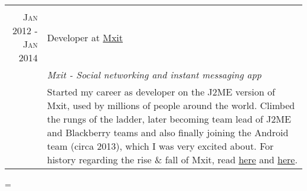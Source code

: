 \documentclass[a4paper,10pt,notitlepage]{article}
\newenvironment{absolutelynopagebreak}
  {\par\nobreak\vfil\penalty0\vfilneg
   \vtop\bgroup}
  {\par\xdef\tpd{\the\prevdepth}\egroup
   \prevdepth=\tpd}
\begin{document}
\begin{absolutelynopagebreak}
\begin{tabular}{r|p{11cm}}
{		\multicolumn{2}{c}{} \\
		\textsc{Jan 2012 - Jan 2014} & Developer at \href{www.mxit.com}{Mxit} \\
		                             & \emph{Mxit - Social networking and instant messaging app} \\
		                             & \footnotesize{Started my career as developer on the J2ME version of Mxit, used by millions of people around the world. Climbed the rungs of the ladder, later becoming team lead of J2ME and Blackberry teams and also finally joining the Android team (circa 2013), which I was very excited about. For history regarding the rise \& fall of Mxit, read \href{https://en.wikipedia.org/wiki/Mxit}{here} and \href{https://www.moneyweb.co.za/news/companies-and-deals/how-did-mxit-go-so-wrong/}{here}.} \\
		
	\end{tabular}
	
\end{absolutelynopagebreak}
\end{document}
